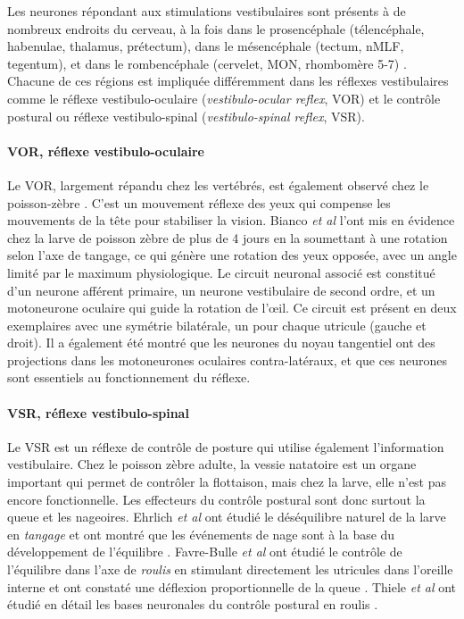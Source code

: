 Les neurones répondant aux stimulations vestibulaires sont présents à de nombreux endroits du cerveau, à la fois dans le prosencéphale (télencéphale, habenulae, thalamus, prétectum), dans le mésencéphale (tectum, nMLF, tegentum), et dans le rombencéphale (cervelet, MON, rhombomère 5-7) \cite{favre-bulle_cellular-resolution_2018}. Chacune de ces régions est impliquée différemment dans les réflexes vestibulaires comme le réflexe vestibulo-oculaire (\emph{vestibulo-ocular reflex}, VOR) et le contrôle postural ou réflexe vestibulo-spinal (\emph{vestibulo-spinal reflex}, VSR).

\paragraph{VOR, réflexe vestibulo-oculaire} \label{VOR}
Le VOR, largement répandu chez les vertébrés, est également observé chez le poisson-zèbre \cite{bianco_tangential_2012}. C'est un mouvement réflexe des yeux qui compense les mouvements de la tête pour stabiliser la vision. Bianco \emph{et al} l'ont mis en évidence chez la larve de poisson zèbre de plus de 4 jours en la soumettant à une rotation selon l'axe de tangage, ce qui génère une rotation des yeux opposée, avec un angle limité par le maximum physiologique. Le circuit neuronal associé est constitué d'un neurone afférent primaire, un neurone vestibulaire de second ordre, et un motoneurone oculaire qui guide la rotation de l’œil. Ce circuit est présent en deux exemplaires avec une symétrie bilatérale, un pour chaque utricule (gauche et droit). Il a également été montré que les neurones du noyau tangentiel ont des projections dans les motoneurones oculaires contra-latéraux, et que ces neurones sont essentiels au fonctionnement du réflexe. 

\paragraph{VSR, réflexe vestibulo-spinal} \label{VSR}
Le VSR est un réflexe de contrôle de posture qui utilise également l'information vestibulaire. Chez le poisson zèbre adulte, la vessie natatoire est un organe important qui permet de contrôler la flottaison, mais chez la larve, elle n'est pas encore fonctionnelle. Les effecteurs du contrôle postural sont donc surtout la queue et les nageoires. Ehrlich \emph{et al} ont étudié le déséquilibre naturel de la larve en \emph{tangage} et ont montré que les événements de nage sont à la base du développement de l'équilibre \cite{ehrlich_control_2017}. Favre-Bulle \emph{et al} ont étudié le contrôle de l'équilibre dans l'axe de \emph{roulis} en stimulant directement les utricules dans l'oreille interne et ont constaté une déflexion proportionnelle de la queue \cite{favre-bulle_cellular-resolution_2018}. Thiele \emph{et al} ont étudié en détail les bases neuronales du contrôle postural en roulis \cite{thiele_descending_2014}.

